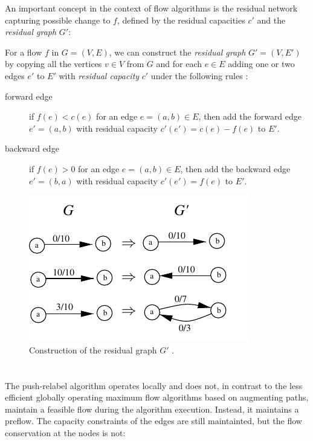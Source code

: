 An important concept in the context of flow algorithms is the residual network capturing possible change to $f$, defined by the residual capacities $c'$ and the \textit{residual graph} $G'$:
\begin{definition}
For a flow $f$ in $G=(V,E)$, we can construct the \textit{residual graph} $G' = (V,E')$ by copying all the vertices $v \in V$ from $G$ and for each $e \in E$ adding one or two edges $e'$ to $E'$ with \textit{residual capacity} $c'$ under the following rules :
\begin{description}
\item[forward edge] if $f(e) < c(e)$ for an edge $e=(a,b) \in E$, then add the forward edge $e' = (a,b)$ with residual capacity $c'(e') = c(e) - f(e)$ to $E'$.
\item[backward edge] if $f(e) > 0$ for an edge $e=(a,b) \in E$, then add the backward edge $e' = (b,a)$ with residual capacity $c'(e') = f(e)$ to $E'$.
\end{description}
\end{definition}

\begin{figure}
\centering
\includegraphics[]{fig/residual}
\caption{Construction of the residual graph $G'$ \cite{mayer2013prakt}.}
\label{fig:residual}
\end{figure}


\section{\pushRelabel{}}
The push-relabel algorithm operates locally and does not, in contrast to the less efficient globally operating maximum flow algorithms based on augmenting paths, maintain a feasible flow during the algorithm execution. Instead, it maintains a preflow. The capacity constraints of the edges are still maintainted, but the flow conservation at the nodes is not:

